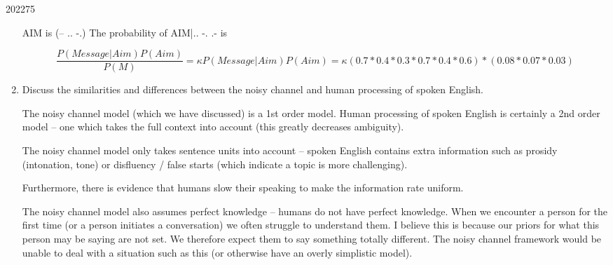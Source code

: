 \documentclass[10pt,\jkfside,a4paper]{article}
\begin{document}
\begin{examquestion}{2022}{7}{5}
\begin{enumerate}
AIM is (-- .. -.) The probability of AIM|.. -. .- is

\[
\frac{P(Message|Aim)P(Aim)}{P(M)}
= \kappa P(Message|Aim)P(Aim)
= \kappa (0.7 * 0.4 * 0.3 * 0.7 * 0.4 * 0.6) * (0.08 * 0.07 * 0.03)
\]

\item Discuss the similarities and differences between the noisy channel and
human processing of spoken English.

The noisy channel model (which we have discussed) is a 1st order model.
Human processing of spoken English is certainly a 2nd order model -- one
which takes the full context into account (this greatly decreases ambiguity).

The noisy channel model only takes sentence units into account -- spoken
English contains extra information such as prosidy (intonation, tone) or
disfluency / false starts (which indicate a topic is more challenging).

Furthermore, there is evidence that humans slow their speaking to make the
information rate uniform.

The noisy channel model also assumes perfect knowledge -- humans do not have
perfect knowledge. When we encounter a person for the first time (or a
person initiates a conversation) we often struggle to understand them. I
believe this is because our priors for what this person may be saying are
not set. We therefore expect them to say something totally different. The
noisy channel framework would be unable to deal with a situation such as
this (or otherwise have an overly simplistic model).

\end{enumerate}

\end{examquestion}
\end{document}
